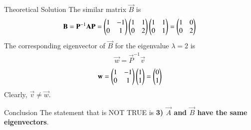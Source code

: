 \documentclass{beamer}
\begin{document}
\begin{frame}{Theoretical Solution}
The similar matrix $\vec{B}$ is
\begin{align}
    \mathbf{B} = \mathbf{P}^{-1}\mathbf{A}\mathbf{P} = \begin{pmatrix}1 & -1 \\ 0 & 1\end{pmatrix}\begin{pmatrix}1 & 1 \\ 0 & 2\end{pmatrix}\begin{pmatrix}1 & 1 \\ 0 & 1\end{pmatrix} = \begin{pmatrix}1 & 0 \\ 0 & 2\end{pmatrix}
\end{align}
The corresponding eigenvector of $\vec{B}$ for the eigenvalue $\lambda=2$ is 
\begin{align}
	\vec{w} = \vec{P}^{-1}\vec{v}
\end{align}
\begin{align}
    \mathbf{w} = \begin{pmatrix}1 & -1 \\ 0 & 1\end{pmatrix}\begin{pmatrix}1 \\ 1\end{pmatrix} = \begin{pmatrix}0 \\ 1\end{pmatrix}
\end{align}
Clearly, $\vec{v} \neq \vec{w}$.
\end{frame}

\begin{frame}{Conclusion}
The statement that is NOT TRUE is \textbf{3) $\vec{A}$ and $\vec{B}$ have the same eigenvectors}.
\end{frame}
\end{document}
